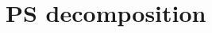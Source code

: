 \documentclass[manuscript,ulem,graphix,revised]{geophysics}
\begin{document}
\section{PS decomposition}
\end{document}
